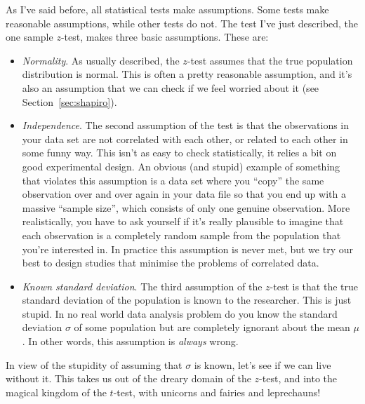 As I've said before, all statistical tests make assumptions. Some tests make reasonable assumptions, while other tests do not. The test I've just described, the one sample $z$-test, makes three basic assumptions. These are:
\begin{itemize}
\item {\it Normality}. As usually described, the $z$-test assumes that the true population distribution is normal. This is often a pretty reasonable assumption, and it's also an assumption that we can check if we feel worried about it (see Section~\ref{sec:shapiro}). 
\item {\it Independence}. The second assumption of the test is that the observations in your data set are not correlated with each other, or related to each other in some funny way. This isn't as easy to check statistically, it relies a bit on good experimental design. An obvious (and stupid) example of something that violates this assumption is a data set where you “copy” the same observation over and over again in your data file so that you end up with a massive “sample size”, which consists of only one genuine observation. More realistically, you have to ask yourself if it's really plausible to imagine that each observation is a completely random sample from the population that you're interested in. In practice this assumption is never met, but we try our best to design studies that minimise the problems of correlated data. 
\item {\it Known standard deviation}. The third assumption of the $z$-test is that the true standard deviation of the population is known to the researcher. This is just stupid. In no real world data analysis problem do you know the standard deviation $\sigma$ of some population but are completely ignorant about the mean $\mu$. In other words, this assumption is {\it always} wrong. 
\end{itemize}
In view of the stupidity of assuming that $\sigma$ is known, let's see if we can live without it. This takes us out of the dreary domain of the $z$-test, and into the magical kingdom of the $t$-test, with unicorns and fairies and leprechauns!


